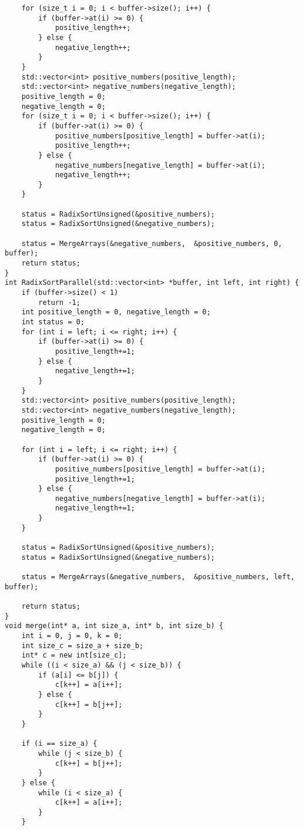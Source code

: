 \documentclass{report}
\begin{document}
\begin{lstlisting}
    for (size_t i = 0; i < buffer->size(); i++) {
        if (buffer->at(i) >= 0) {
            positive_length++;
        } else {
            negative_length++;
        }
    }
    std::vector<int> positive_numbers(positive_length);
    std::vector<int> negative_numbers(negative_length);
    positive_length = 0;
    negative_length = 0;
    for (size_t i = 0; i < buffer->size(); i++) {
        if (buffer->at(i) >= 0) {
            positive_numbers[positive_length] = buffer->at(i);
            positive_length++;
        } else {
            negative_numbers[negative_length] = buffer->at(i);
            negative_length++;
        }
    }

    status = RadixSortUnsigned(&positive_numbers);
    status = RadixSortUnsigned(&negative_numbers);

    status = MergeArrays(&negative_numbers,  &positive_numbers, 0,  buffer);
    return status;
}
int RadixSortParallel(std::vector<int> *buffer, int left, int right) {
    if (buffer->size() < 1)
        return -1;
    int positive_length = 0, negative_length = 0;
    int status = 0;
    for (int i = left; i <= right; i++) {
        if (buffer->at(i) >= 0) {
            positive_length+=1;
        } else {
            negative_length+=1;
        }
    }
    std::vector<int> positive_numbers(positive_length);
    std::vector<int> negative_numbers(negative_length);
    positive_length = 0;
    negative_length = 0;

    for (int i = left; i <= right; i++) {
        if (buffer->at(i) >= 0) {
            positive_numbers[positive_length] = buffer->at(i);
            positive_length+=1;
        } else {
            negative_numbers[negative_length] = buffer->at(i);
            negative_length+=1;
        }
    }

    status = RadixSortUnsigned(&positive_numbers);
    status = RadixSortUnsigned(&negative_numbers);

    status = MergeArrays(&negative_numbers,  &positive_numbers, left,  buffer);

    return status;
}
void merge(int* a, int size_a, int* b, int size_b) {
    int i = 0, j = 0, k = 0;
    int size_c = size_a + size_b;
    int* c = new int[size_c];
    while ((i < size_a) && (j < size_b)) {
        if (a[i] <= b[j]) {
            c[k++] = a[i++];
        } else {
            c[k++] = b[j++];
        }
    }

    if (i == size_a) {
        while (j < size_b) {
            c[k++] = b[j++];
        }
    } else {
        while (i < size_a) {
            c[k++] = a[i++];
        }
    }


\end{lstlisting}
\end{document}
